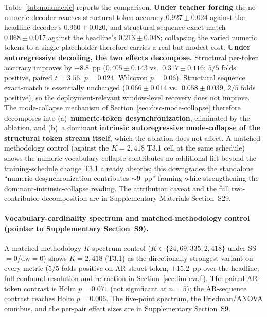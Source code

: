 \documentclass[sensors,article,submit,moreauthors,pdftex]{Definitions/mdpi}
\begin{document}
Table~\ref{tab:nonumeric} reports the comparison. \textbf{Under teacher forcing} the no-numeric decoder reaches structural token accuracy $0.927 \pm 0.024$ against the headline decoder's $0.960 \pm 0.020$, and structural sequence exact-match $0.068 \pm 0.017$ against the headline's $0.213 \pm 0.048$; collapsing the varied numeric tokens to a single placeholder therefore carries a real but modest cost. \textbf{Under autoregressive decoding, the two effects decompose.} Structural per-token accuracy improves by $+8.8$~pp ($0.405 \pm 0.143$ vs.\ $0.317 \pm 0.116$; $5/5$ folds positive, paired $t=3.56$, $p=0.024$, Wilcoxon $p=0.06$). Structural sequence exact-match is essentially unchanged ($0.066 \pm 0.014$ vs.\ $0.058 \pm 0.039$, $2/5$ folds positive), so the deployment-relevant window-level recovery does not improve. The mode-collapse mechanism of Section~\ref{sec:disc-mode-collapse} therefore decomposes into (a)~\textbf{numeric-token desynchronization}, eliminated by the ablation, and (b)~a dominant \textbf{intrinsic autoregressive mode-collapse of the structural token stream itself}, which the ablation does not affect. A matched-methodology control (against the $K\!=\!2{,}418$ T3.1 cell at the same schedule) shows the numeric-vocabulary collapse contributes no additional lift beyond the training-schedule change T3.1 already absorbs; this downgrades the standalone ``numeric-desynchronization contributes $\sim\!9$~pp'' framing while strengthening the dominant-intrinsic-collapse reading. The attribution caveat and the full two-contributor decomposition are in Supplementary Materials Section~S29.



\paragraph{Vocabulary-cardinality spectrum and matched-methodology control (pointer to Supplementary Section~S9).}
A matched-methodology $K$-spectrum control ($K\!\in\!\{24, 69, 335, 2{,}418\}$ under SS$=$0/dw$=$0) shows $K\!=\!2{,}418$ (T3.1) as the directionally strongest variant on every metric ($5/5$ folds positive on AR struct token, $+15.2$~pp over the headline; full confound resolution and retraction in Section~\ref{sec:lim-eval}). The paired AR-token contrast is Holm $p\!=\!0.071$ (not significant at $n\!=\!5$); the AR-sequence contrast reaches Holm $p\!=\!0.006$. The five-point spectrum, the Friedman/ANOVA omnibus, and the per-pair effect sizes are in Supplementary Section~S9.
\end{document}
